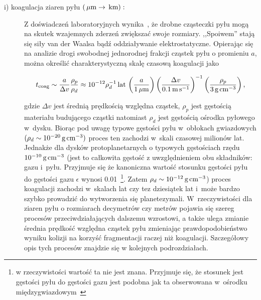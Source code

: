 \begin{description}
   \item[i) koagulacja ziaren pyłu $\left(\hbox{$\thinspace\mu\textrm{m}$} \rightarrow \hbox{$\thinspace\textrm{km}$}\right):$] 
      Z doświadczeń laboratoryjnych wynika~\cite{BW08}, że drob\-ne cząsteczki pyłu
      mogą na skutek wzajemnych zderzeń zwiększać swoje rozmiary. ,,Spoiwem'' stają
      się siły van der Waalsa bądź oddziaływanie elektrostatyczne. Opierając się
      na analizie drogi swobodnej jednorodnej frakcji cząstek pyłu o promieniu
      $a$, można określić charakterystyczną skalę czasową koagulacji jako 

   \begin{equation}\label{coag} 
      t_{\textrm{coag}} %
      \sim \frac{a}{\Delta v}\frac{\rho_p}{\rho_d} \approx 
      10^{-12} \rho_d^{-1}\yr\thinspace
      \left(\frac{a}{1\mum}\right)
      \left(\frac{\Delta v}{0.1\m\s^{-1}}\right)^{-1}
      \left(\frac{\rho_p}{3\g\cm^{-3}}\right),
   \end{equation}

   gdzie $\Delta v$ jest średnią prędkością względna cząstek, $\rho_p$ jest
   gęstością materiału budującego cząstki natomiast $\rho_d$ jest gęstością
   ośrodka pyłowego w~dysku.  Biorąc pod uwagę typowe gęstości pyłu w~obłokach
   gwiazdowych $(\rho_d \sim 10^{-20}\hbox{$\thinspace\textrm{g}$}\hbox{$\thinspace\textrm{cm}$}^{-3})$ proces ten zachodzi w~skali
   czasowej milionów lat. Jednakże dla dysków protoplanetarnych o typowych
   gęstościach rzędu $10^{-10}\hbox{$\thinspace\textrm{g}$}\hbox{$\thinspace\textrm{cm}$}^{-3}$ (jest to całkowita gęstość z
   uwzględnieniem obu składników: gazu i~pyłu. Przyjmuje się że kanoniczna
   wartość stosunku gęstości pyłu do gęstości gazu $\epsilon$ wynosi
   0.01~\footnote{w rzeczywistości wartość ta nie jest znana. Przyjmuje się, że
   stosunek jest gęstości pyłu do gęstości gazu jest podobna jak ta obserwowana
   w~ośrodku międzygwiazdowym~\cite{FS03}}. Zatem $\rho_d \sim
   10^{-12}\hbox{$\thinspace\textrm{g}$}\hbox{$\thinspace\textrm{cm}$}^{-3}$) proces koagulacji zachodzi w~skalach lat czy tez
   dziesiątek lat i~może bardzo szybko prowadzić do wytworzenia się
   planetezymali. W~rzeczywistości dla ziaren pyłu o rozmiarach decymetrów czy
   metrów pojawia się szereg procesów przeciwdziałających dalszemu wzrostowi, a
   także ulega zmianie średnia prędkość względna cząstek pyłu zmieniając
   prawdopodobieństwo wyniku kolizji na korzyść fragmentacji raczej niż
   koagulacji. Szczegółowy opis tych procesów znajdzie się w kolejnych podrozdziałach.


\end{description}

